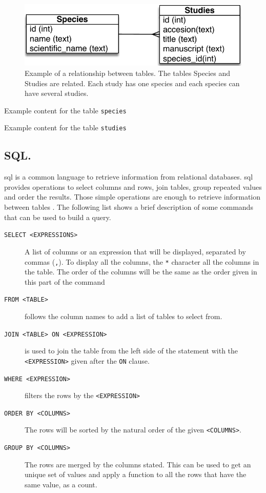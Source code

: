 \begin{figure}
\centering
\includegraphics{expVIP/Figures/miniER.pdf}
\caption[Example of a relationship between tables.]{Example of a relationship between tables. The tables Species and Studies are related. Each study has one species and each species can have several studies.}
\label{fig:expvip:miniER}
\end{figure}

\begin{table}
\caption[Species]{Example content for the table \texttt{species}}
\label{exp:tab:species}
\centering

\end{table}

\begin{table}
\caption[Studies]{Example content for the table \texttt{studies}}
\label{exp:tab:studies}
\centering

\end{table}

\subsection{SQL.}
\gls{sql} is a common language to retrieve information from relational databases. 
\acrshort{sql} provides operations to select columns and rows, join tables, group repeated values and order the results. 
Those simple operations are enough to retrieve information between tables \citep{Oracle2014}. 
The following list shows a brief description of some commands  that can be used to build a query.  

\begin{description}
\item[\texttt{SELECT <EXPRESSIONS>}] A list of columns or an expression that will be displayed, separated by commas (\texttt{,}). To display all the columns, the \texttt{*} character  all the columns in the table. The order of the columns will be the same as the order given in this part of the command
\item[\texttt{FROM <TABLE>}] follows the column names to add a list of tables to select from.
\item[\texttt{JOIN <TABLE> ON <EXPRESSION>}] is used to join the table from the left side of the statement with the \texttt{<EXPRESSION>} given after the \texttt{ON} clause.  
\item[\texttt{WHERE <EXPRESSION>}] filters the rows by the \texttt{<EXPRESSION>}
\item[\texttt{ORDER BY <COLUMNS>}] The rows will be sorted by the natural order of the given \texttt{<COLUMNS>}.  
\item[\texttt{GROUP BY <COLUMNS>}] The rows are merged by the columns stated. This can be used to get an unique set of values and apply a function to all the rows that have the same value, as a count.
\end{description} 

